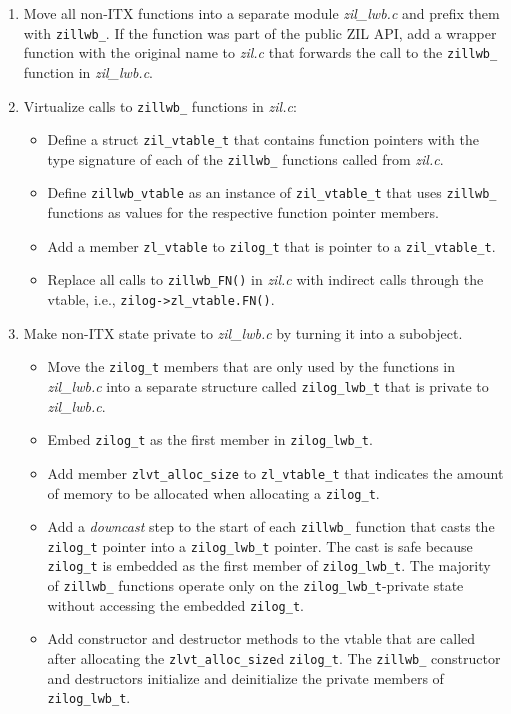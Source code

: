 \documentclass[12pt,a4paper,twoside]{book}
\begin{document}
\begin{enumerate}[noitemsep]
    \item Move all non-ITX functions into a separate module \textit{zil\_lwb.c} and prefix them with \lstinline{zillwb_}.
          If the function was part of the public ZIL API, add a wrapper function with the original name to \textit{zil.c} that forwards the call to the \lstinline{zillwb_} function in \textit{zil\_lwb.c}.
    \item Virtualize calls to \lstinline{zillwb_} functions in \textit{zil.c}:
          \begin{itemize}
              \item Define a struct \lstinline{zil_vtable_t} that contains function pointers with the type signature of each of the \lstinline{zillwb_} functions called from \textit{zil.c}.
              \item Define \lstinline{zillwb_vtable} as an instance of \lstinline{zil_vtable_t} that uses \lstinline{zillwb_} functions as values for the respective function pointer members.
              \item Add a member \lstinline{zl_vtable} to \lstinline{zilog_t} that is pointer to a \lstinline{zil_vtable_t}.
              \item Replace all calls to \lstinline{zillwb_FN()} in \textit{zil.c} with indirect calls through the vtable, i.e., \lstinline{zilog->zl_vtable.FN()}.
          \end{itemize}
    \item Make non-ITX state private to \textit{zil\_lwb.c} by turning it into a subobject.
          \begin{itemize}
              \item Move the \lstinline{zilog_t} members that are only used by the functions in \textit{zil\_lwb.c} into a separate structure called \lstinline{zilog_lwb_t} that is private to \textit{zil\_lwb.c}.
              \item Embed \lstinline{zilog_t} as the first member in \lstinline{zilog_lwb_t}.
              \item Add member \lstinline{zlvt_alloc_size} to \lstinline{zl_vtable_t} that indicates the amount of memory to be allocated when allocating a \lstinline{zilog_t}.
              \item Add a \textit{downcast} step to the start of each \lstinline{zillwb_} function that casts the \lstinline{zilog_t} pointer into a \lstinline{zilog_lwb_t} pointer.
                The cast is safe because \lstinline{zilog_t} is embedded as the first member of \lstinline{zilog_lwb_t}.
                The majority of \lstinline{zillwb_} functions operate only on the \lstinline{zilog_lwb_t}-private state without accessing the embedded \lstinline{zilog_t}.
              \item Add constructor and destructor methods to the vtable that are called after allocating the \lstinline{zlvt_alloc_size}d \lstinline{zilog_t}.
                The \lstinline{zillwb_} constructor and destructors initialize and deinitialize the private members of \lstinline{zilog_lwb_t}.
          \end{itemize}
\end{enumerate}
\end{document}
